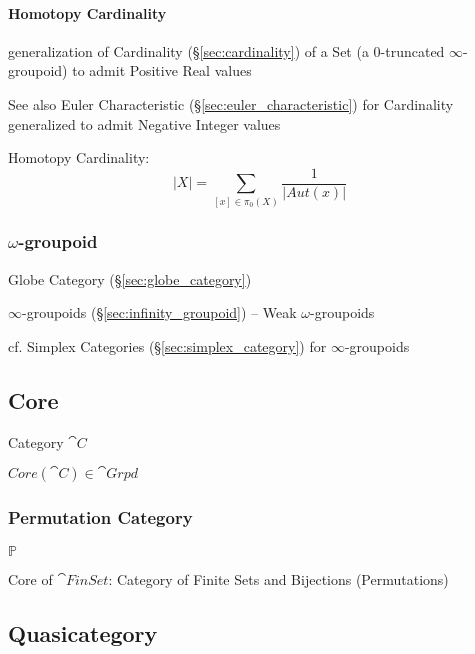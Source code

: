 \paragraph{Homotopy Cardinality}\label{sec:homotopy_cardinality}\hfill

generalization of Cardinality (\S\ref{sec:cardinality}) of a Set (a
$0$-truncated $\infty$-groupoid) to admit Positive Real values

\fist See also Euler Characteristic (\S\ref{sec:euler_characteristic})
for Cardinality generalized to admit Negative Integer values

Homotopy Cardinality:
\[
  |X| = \sum_{[x] \in \pi_0(X)} \frac{1}{|Aut(x)|}
\] %



\subsubsection{$\omega$-groupoid}\label{sec:omega_groupoid}

Globe Category (\S\ref{sec:globe_category})

$\infty$-groupoids (\S\ref{sec:infinity_groupoid}) -- Weak
$\omega$-groupoids

\fist cf. Simplex Categories (\S\ref{sec:simplex_category}) for
$\infty$-groupoids



\subsection{Core}\label{sec:core}

Category $\cat{C}$

$Core(\cat{C}) \in \cat{Grpd}$



\subsubsection{Permutation Category}\label{sec:permutation_category}

$\mathbb{P}$

Core of $\cat{FinSet}$: Category of Finite Sets and Bijections
(Permutations)



\subsection{Quasicategory}\label{sec:quasicategory}

